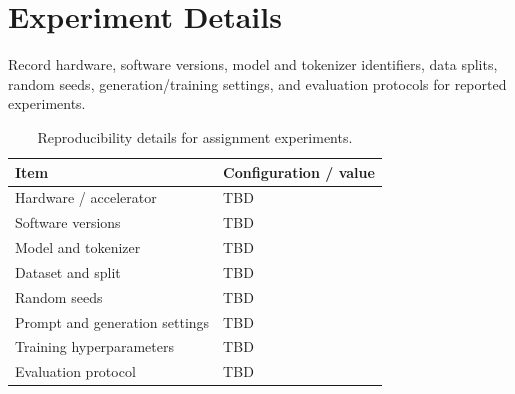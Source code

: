 \section{Experiment Details}
\label{app:experiment-details}

Record hardware, software versions, model and tokenizer identifiers, data splits, random seeds, generation/training settings, and evaluation protocols for reported experiments.

\begin{table}[htbp]\centering\small
\begin{tabular}{@{}ll@{}}\toprule
Item & Configuration / value \\\midrule
Hardware / accelerator & TBD \\
Software versions & TBD \\
Model and tokenizer & TBD \\
Dataset and split & TBD \\
Random seeds & TBD \\
Prompt and generation settings & TBD \\
Training hyperparameters & TBD \\
Evaluation protocol & TBD \\
\bottomrule\end{tabular}
\caption{Reproducibility details for assignment experiments.}\label{tab:experiment-details}\end{table}

